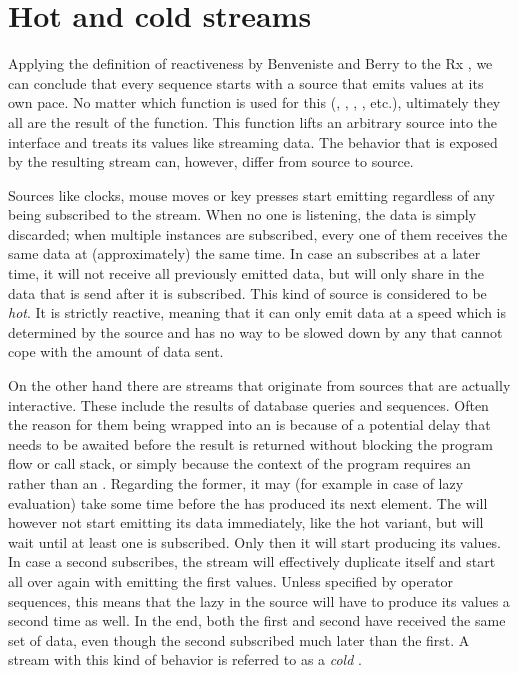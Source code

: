 \section{Hot and cold streams}
Applying the definition of reactiveness by Benveniste and Berry \cite{berry1991-Reactive} to the Rx \obs, we can conclude that every \obs sequence starts with a source that emits values at its own pace. No matter which function is used for this (, , , , etc.), ultimately they all are the result of the  function. This function lifts an arbitrary source into the \obs interface and treats its values like streaming data. The behavior that is exposed by the resulting stream can, however, differ from source to source.

Sources like clocks, mouse moves or key presses start emitting regardless of any \obv being subscribed to the stream. When no one is listening, the data is simply discarded; when multiple \obv instances are subscribed, every one of them receives the same data at (approximately) the same time. In case an \obv subscribes at a later time, it will not receive all previously emitted data, but will only share in the data that is send after it is subscribed. This kind of source is considered to be \textit{hot}. It is strictly reactive, meaning that it can only emit data at a speed which is determined by the source and has no way to be slowed down by any \obv that cannot cope with the amount of data sent.

On the other hand there are streams that originate from sources that are actually interactive. These include the results of database queries and \ieb sequences. Often the reason for them being wrapped into an \obs is because of a potential delay that needs to be awaited before the result is returned without blocking the program flow or call stack, or simply because the context of the program requires an \obs rather than an \ieb. Regarding the former, it may (for example in case of lazy evaluation) take some time before the \ier has produced its next element. The \obs will however not start emitting its data immediately, like the hot variant, but will wait until at least one \obv is subscribed. Only then it will start producing its values. In case a second \obv subscribes, the stream will effectively duplicate itself and start all over again with emitting the first values. Unless specified by operator sequences, this means that the lazy \ier in the source will have to produce its values a second time as well. In the end, both the first and second \obv have received the same set of data, even though the second subscribed much later than the first. A stream with this kind of behavior is referred to as a \textit{cold} \obs.


